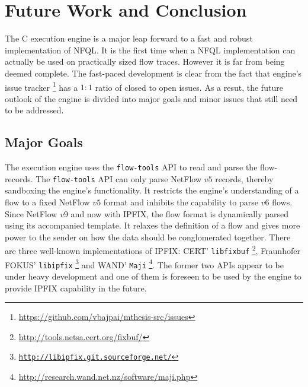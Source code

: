 \chapter{Future Work and Conclusion}\label{ch:future-work}

The C execution engine is a major leap forward to a fast and robust
implementation of \ac{NFQL}. It is the first time when a \ac{NFQL}
implementation can actually be used on practically sized flow traces. However
it is far from being deemed complete. The fast-paced development is clear from
the fact that engine's issue tracker
\footnote{\url{https://github.com/vbajpai/mthesis-src/issues}} has a $1:1$
ratio of closed to open issues. As a resut, the future outlook of the engine
is divided into major goals and minor issues that still need to be addressed.

\section{Major Goals}\label{sec:major-goals}

The execution engine uses the \texttt{flow-tools} \ac{API} to read and parse
the flow-records. The \texttt{flow-tools} \ac{API} can only parse NetFlow $v5$
records, thereby sandboxing the engine's functionality. It restricts the
engine's understanding of a flow to a fixed NetFlow $v5$ format and inhibits
the capability to parse $v6$ flows. Since NetFlow $v9$ and now with
\ac{IPFIX}, the flow format  is dynamically parsed
using its accompanied template. It relaxes the definition of a flow and gives
more power to the sender on how the data should be conglomerated together.
There are three well-known implementations of \ac{IPFIX}: CERT'
\texttt{libfixbuf} \footnote{\url{http://tools.netsa.cert.org/fixbuf/}},
Fraunhofer FOKUS' \texttt{libipfix}
\footnote{\href{http://libipfix.git.sourceforge.net/git/gitweb.cgi?p=libipfix/libipfix;a=summary}{\texttt{http://libipfix.git.sourceforge.net/}}}
and WAND' \texttt{Maji}
\footnote{\url{http://research.wand.net.nz/software/maji.php}}. The former two
\ac{API}s appear to be under heavy development and one of them is foreseen to
be used by the engine to provide \ac{IPFIX} capability in the future.




